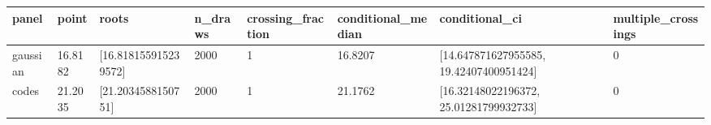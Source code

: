 \begin{tabular}{llllllll}
\toprule
panel & point & roots & n\_draws & crossing\_fraction & conditional\_median & conditional\_ci & multiple\_crossings \\
\midrule
gaussian & 16.8182 & [16.818155915239572] & 2000 & 1 & 16.8207 & [14.647871627955585, 19.42407400951424] & 0 \\
codes & 21.2035 & [21.2034588150751] & 2000 & 1 & 21.1762 & [16.32148022196372, 25.01281799932733] & 0 \\
\bottomrule
\end{tabular}
